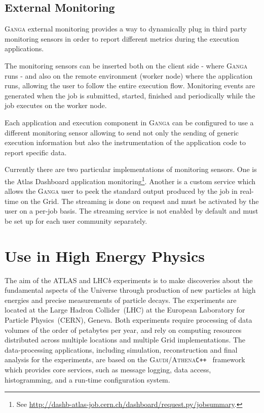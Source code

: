 \documentclass{elsart}
\def\lhcb {LHC{\em b\/}\xspace}
\def\atlas {ATLAS\xspace}
\def\lhc {LHC\xspace}
\def\ganga {\textsc{Ganga}\xspace}
\def\gaudi {\textsc{Gaudi}\xspace}
\def\athena {\textsc{Athena}\xspace}
\def\grid {Grid\xspace}
\newcommand{\code}[1]{\texttt{#1}}
\begin{document}
\subsection{External Monitoring}
\label{sec:ExternalMonitoring}
\ganga external monitoring provides a way to dynamically plug in third party
monitoring sensors in order to report different metrics during the execution
applications. 

The monitoring sensors can be inserted both on the client side - where \ganga
runs - and also on the remote environment (worker node) where the application
runs, allowing the user to follow the entire execution flow.  Monitoring
events are generated when the job is submitted, started, finished and
periodically while the job executes on the worker node.

Each application and execution component in \ganga can be configured to use a
different monitoring sensor allowing to send not only the sending of generic execution
information but also the instrumentation of the application code to report
specific data.

Currently there are two particular implementations of monitoring sensors. One
is the Atlas Dashboard application monitoring\footnote{See
  \url{http://dashb-atlas-job.cern.ch/dashboard/request.py/jobsummary}.}.
Another is a custom service which allows the \ganga user to peek the standard
output produced by the job in real-time on the \grid. The streaming is done on
request and must be activated by the user on a per-job basis. The streaming service
is not enabled by default and must be set up for each user community separately.

\section{Use in High Energy Physics}
\label{sec:useHEP}

The aim of the \atlas and \lhcb experiments is to make discoveries about the
fundamental aspects of the Universe through production of new particles at 
high energies and precise measurements of particle decays. The experiments
are located at the Large Hadron Collider~(\lhc) at the European Laboratory for
Particle Physics~(CERN), Geneva. Both experiments require processing of data
volumes of the order of petabytes per year, and rely on computing resources
distributed across multiple locations and multiple \grid implementations. The data-processing applications,
including simulation, reconstruction and final analysis for the experiments,
are based on the \gaudi/\athena \code{C++}~\cite{gaudi} framework which
provides core services, such as message logging, data access, histogramming,
and a run-time configuration system. 
\end{document}
